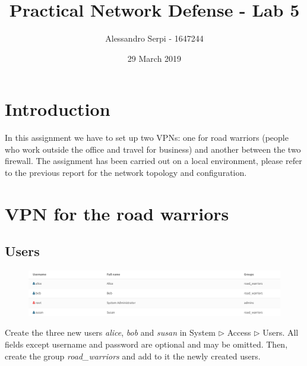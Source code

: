 \documentclass{homework}
\title{Practical Network Defense - Lab 5}
\author{Alessandro Serpi - 1647244}
\date{29 March 2019}
\begin{document}
    \maketitle
    \tableofcontents
    
    
    \pagebreak
    \section{Introduction}
    In this assignment we have to set up two VPNs: one for road warriors (people who work outside the office and travel for business) and another between the two firewall.
    The assignment has been carried out on a local environment, please refer to the previous report for the network topology and configuration.
    
    \section{VPN for the road warriors}
    \subsection{Users}
    \vspace{-10pt}
    \begin{figure}[H]
        \centering
        \includegraphics[width=\linewidth]{openvpn/users}
        \label{fig:users}
    \end{figure}
    \vspace{-20pt}
    Create the three new users \textit{alice}, \textit{bob} and \textit{susan} in System $\triangleright$ Access $\triangleright$ Users.
    All fields except username and password are optional and may be omitted. 
    Then, create the group \textit{road\_warriors} and add to it the newly created users.
    
\end{document}
